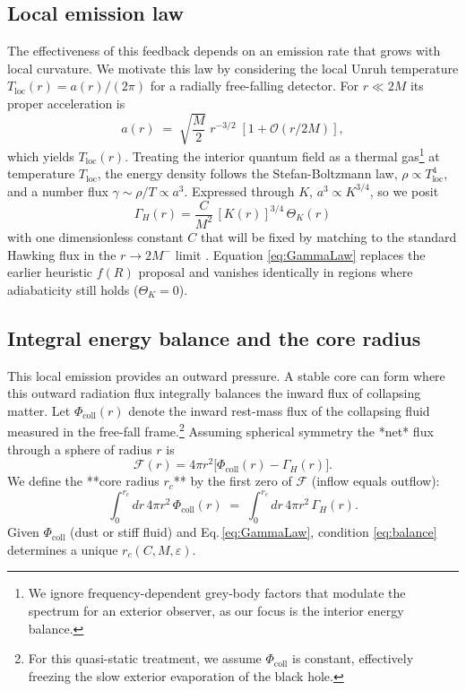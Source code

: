 \subsection{Local emission law}
\label{sec:local_emission}

The effectiveness of this feedback depends on an emission rate that grows with local curvature. We motivate this law by considering the local Unruh temperature $T_{\mathrm{loc}}(r)=a(r)/(2\pi)$ \cite{Unruh1976} for a radially free-falling detector. For $r\ll2M$ \cite{Barbado2011} its proper acceleration is
\begin{equation}
  a(r)\;=\;\sqrt{\frac{M}{2}}\;r^{-3/2}\;[1+\mathcal{O}(r/2M)] ,
\end{equation}
which yields $T_{\mathrm{loc}}(r)$. Treating the interior quantum field as a thermal gas\footnote{We ignore frequency-dependent grey-body factors that modulate the spectrum for an exterior observer, as our focus is the interior energy balance.} at temperature $T_{\mathrm{loc}}$, the energy density follows the Stefan-Boltzmann law, $\rho \propto T_{\mathrm{loc}}^{4}$, and a number flux $\gamma\sim\rho/T\propto a^{3}$. Expressed through $K$, $a^{3}\!\propto\!K^{3/4}$, so we posit
\begin{equation}
  \boxed{\;
    \Gamma_H(r)=\frac{C}{M^{2}}\,[K(r)]^{3/4}\,\Theta_K(r)
  \;}
  \label{eq:GammaLaw}
\end{equation}
with one dimensionless constant $C$ that will be fixed by matching to the standard Hawking flux in the $r\!\to\!2M^{-}$ limit \cite{hawking1975particle}. Equation \eqref{eq:GammaLaw} replaces the earlier heuristic $f(R)$ proposal and vanishes identically in regions where adiabaticity still holds ($\Theta_K=0$).

\subsection{Integral energy balance and the core radius}
\label{sec:balance}

This local emission provides an outward pressure. A stable core can form where this outward radiation flux integrally balances the inward flux of collapsing matter. Let $\Phi_{\mathrm{coll}}(r)$ denote the inward rest-mass flux of the collapsing fluid measured in the free-fall frame.\footnote{For this quasi-static treatment, we assume $\Phi_{\mathrm{coll}}$ is constant, effectively freezing the slow exterior evaporation of the black hole.} Assuming spherical symmetry the *net* flux through a sphere of radius $r$ is
\[
  \mathcal{F}(r)=4\pi r^{2}\bigl[\Phi_{\mathrm{coll}}(r)-\Gamma_H(r)\bigr].
\]
We define the **core radius $r_c$** by the first zero of $\mathcal{F}$ (inflow equals outflow):
\begin{equation}
  \int_{0}^{r_c}\!dr\,4\pi r^{2}\,\Phi_{\mathrm{coll}}(r)
  \;=\;
  \int_{0}^{r_c}\!dr\,4\pi r^{2}\,\Gamma_H(r).
  \label{eq:balance}
\end{equation}
Given $\Phi_{\mathrm{coll}}$ (dust or stiff fluid) and Eq.\,\eqref{eq:GammaLaw}, condition \eqref{eq:balance} determines a unique $r_c(C,M,\varepsilon)$.

